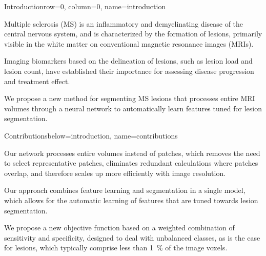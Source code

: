 \documentclass[%
landscape,
a0paper,
margin=2cm,
fontscale=0.3
]{baposter}
\begin{document}
\begin{poster}

% 
% 


\begin{headerblock}{Introduction}{row=0, column=0, name=introduction}
\begin{compactitem}
\item Multiple sclerosis (MS) is an inflammatory and demyelinating disease of
the central nervous system, and is characterized by the formation of lesions,
primarily visible in the white matter on conventional magnetic resonance images
(MRIs).
\item Imaging biomarkers based on the delineation of lesions, such as lesion
load and lesion count, have established their importance for assessing disease
progression and treatment effect.
\item We propose a new method for segmenting MS lesions that processes entire
MRI volumes through a neural network
to automatically learn features tuned for lesion segmentation. 
\end{compactitem}
\end{headerblock}


\begin{headerblock}{Contributions}{below=introduction, name=contributions}
\begin{compactitem}
\item Our network processes entire volumes instead of patches, which removes the
need to select representative patches, eliminates redundant calculations where
patches overlap, and therefore scales up more efficiently with image resolution.
\item Our approach combines feature learning and segmentation in a single model,
which allows for the automatic learning of features that are tuned towards lesion
segmentation.
\item We propose a new objective function based on a weighted combination of
sensitivity and specificity, designed to deal with unbalanced classes, as is the
case for lesions, which typically comprise less than \SI{1}{\percent} of the
image voxels.
\end{compactitem}
\end{headerblock}


\end{poster}
\end{document}
